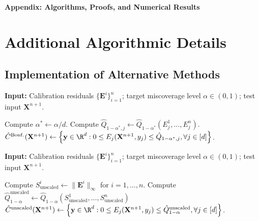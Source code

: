 \setcounter{algorithm}{0}
\setcounter{figure}{0}
\setcounter{equation}{0}
\setcounter{theorem}{0}

\renewcommand{\thetheorem}{S\arabic{theorem}}
\renewcommand{\thelemma}{S\arabic{lemma}}
\renewcommand{\theequation}{S\arabic{equation}}
\renewcommand{\thefigure}{S\arabic{figure}}
\renewcommand{\thetable}{S\arabic{table}}
\renewcommand{\thealgorithm}{S\arabic{algorithm}}


\begin{center}
    \Large \textbf{Appendix: Algorithms, Proofs, and Numerical Results}
\end{center}

\section{Additional Algorithmic Details} \label{app:algorithms}

\subsection{Implementation of Alternative Methods}

\begin{algorithm}[!htb]
    \caption{Separate Prediction Intervals with Bonferroni Correction}
    \label{alg:bonferroni}
    \textbf{Input:} Calibration residuals $\{\mathbf{E}^i\}_{i=1}^{n}$; target miscoverage level $\alpha\in(0,1)$; test input $\mathbf{X}^{n+1}$.
    \begin{algorithmic}[1]
        \State Compute $\alpha^* \gets \alpha/d$.
        \State Compute $\hat{Q}_{1-\alpha^*,j} \gets \hat{Q}_{1-\alpha^*}(E^1_j,\ldots,E^n_j)$.
        \EndFor
        \State \Return $\hat{C}^{\mathrm{Bonf.}}(\mathbf{X}^{n+1}) \gets \left\{\mathbf y \in \R^d: 0 \leq E_j(\mathbf{X}^{n+1},y_j) \leq \hat{Q}_{1-\alpha^*,j}, \forall j \in [d]\right\}$.
    \end{algorithmic}
\end{algorithm}

\begin{algorithm}[!htb]
    \caption{Prediction Intervals via Dimension Reduction with $\ell_\infty$-Norm (Unscaled)}
    \label{alg:unscaled}
    \textbf{Input:} Calibration residuals $\{\mathbf{E}^i\}_{i=1}^{n}$; target miscoverage level $\alpha\in(0,1)$; test input $\mathbf{X}^{n+1}$.
    \begin{algorithmic}[1]
        \State Compute $S^i_{\mathrm{unscaled}} \gets \|\mathbf{E}^i\|_\infty$ for $i = 1,\ldots,n$.
        \State Compute $\hat{Q}^{\mathrm{unscaled}}_{1-\alpha} \gets \hat{Q}_{1-\alpha}(S^1_{\mathrm{unscaled}},\dots, S^n_{\mathrm{unscaled}})$
        \State \Return $\hat{C}^{\mathrm{unscaled}}(\mathbf{X}^{n+1}) \gets \left\{\mathbf y \in \R^d: 0 \leq E_j(\mathbf{X}^{n+1},y_j) \leq \hat{Q}^{\mathrm{unscaled}}_{1-\alpha}, \forall j \in [d]\right\}$.
    \end{algorithmic}
\end{algorithm}

